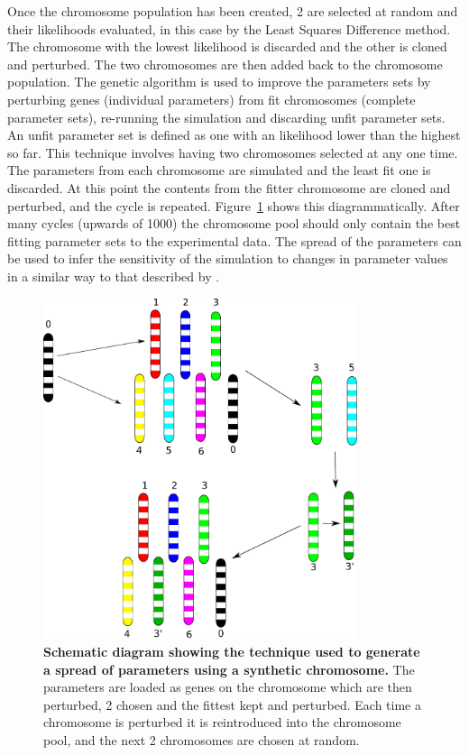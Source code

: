 Once the chromosome population has been created, 2 are selected at random and their likelihoods evaluated, in this case by the Least Squares Difference method. The chromosome with the lowest likelihood is discarded and the other is cloned and perturbed. The two chromosomes are then added back to the chromosome population. The genetic algorithm is used to improve the parameters sets by perturbing genes (individual parameters) from fit chromosomes (complete parameter sets), re-running the simulation and discarding unfit parameter sets. An unfit parameter set is defined as one with an likelihood lower than the highest so far. This technique involves having two chromosomes selected at any one time. The parameters from each chromosome are simulated and the least fit one is discarded. At this point the contents from the fitter chromosome are cloned and perturbed, and the cycle is repeated. Figure~\ref{fig:sa_spread} shows this diagrammatically. After many cycles (upwards of 1000) the chromosome pool should only contain the best fitting parameter sets to the experimental data. The spread of the parameters can be used to infer the sensitivity of the simulation to changes in parameter values in a similar way to that described by \citet{Toni2009}.\\
\begin{figure}[tbp]
\begin{center}
\includegraphics[height=10cm]{./03-parameterestimationmethodologies/data/sa_spread.pdf}
\end{center}
\caption[{Schematic diagram showing the technique used to generate a spread of parameters using a synthetic chromosome.}]{{\bf Schematic diagram showing the technique used to generate a spread of parameters using a synthetic chromosome.} The parameters are loaded as genes on the chromosome which are then perturbed, 2 chosen and the fittest kept and perturbed. Each time a chromosome is perturbed it is reintroduced into the chromosome pool, and the next 2 chromosomes are chosen at random.
\label{fig:sa_spread}}
\end{figure}
